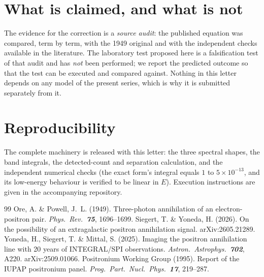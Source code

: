 \documentclass[11pt,a4paper]{article}
\begin{document}
\section{What is claimed, and what is not}
The evidence for the correction is a \emph{source audit}: the
published equation was compared, term by term, with the 1949 original
and with the independent checks available in the literature. The
laboratory test proposed here is a falsification test of that audit
and has \emph{not} been performed; we report the predicted
outcome so that the test can be executed and compared against.
Nothing in this letter depends on any model of the present series,
which is why it is submitted separately from it.

\section{Reproducibility}
The complete machinery is released with this letter: the three
spectral shapes, the band integrals, the detected-count and
separation calculation, and the independent numerical checks
(the exact form's integral equals $1$ to $5\times 10^{-13}$, and
its low-energy behaviour is verified to be linear in $E$).
Execution instructions are given in the accompanying repository.

\begin{thebibliography}{99}
     Ore, A. \& Powell, J.~L. (1949). Three-photon
    annihilation of an electron-positron pair. \textit{Phys.\ Rev.\ \textbf{75}},
    1696--1699.
     Siegert, T. \& Yoneda, H. (2026). On the possibility of
    an extragalactic positron annihilation signal.
    arXiv:2605.21289.
     Yoneda, H., Siegert, T. \& Mittal, S. (2025).
    Imaging the positron annihilation line with 20 years of
    INTEGRAL/SPI observations. \textit{Astron.\ Astrophys.\ \textbf{702}},
    A220. arXiv:2509.01066.
     Positronium Working Group (1995). Report of the
    IUPAP positronium panel. \textit{Prog.\ Part.\ Nucl.\ Phys.\ \textbf{17}},
    219--287.
\end{thebibliography}
\end{document}
